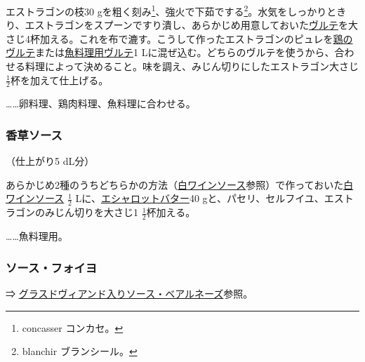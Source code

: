 \begin{recette}
エストラゴンの枝30 gを粗く刻み\footnote{concasser コンカセ。}、強火で下茹でする\footnote{blanchir
  ブランシール。}。水気をしっかりときり、エストラゴンをスプーンですり潰し、あらかじめ用意しておいた\protect\hyperlink{veloute}{ヴルテ}を大さじ4杯加える。これを布で漉す。こうして作ったエストラゴンのピュレを\protect\hyperlink{veloute-de-volaille}{鶏のヴルテ}または\protect\hyperlink{veloute-de-poisson}{魚料理用ヴルテ}1
Lに混ぜ込む。どちらのヴルテを使うから、合わせる料理によって決めること。味を調え、みじん切りにしたエストラゴン大さじ
\(\frac{1}{2}\)杯を加えて仕上げる。

\ldots{}\ldots{}卵料理、鶏肉料理、魚料理に合わせる。

\atoaki{}

\hypertarget{sauce-aux-fines-herbes-blanche}{%
\subsubsection{香草ソース}\label{sauce-aux-fines-herbes-blanche}}



（仕上がり5 dL分）

あらかじめ2種のうちどちらかの方法（\protect\hyperlink{sauce-vin-blanc}{白ワインソース}参照）で作っておいた\protect\hyperlink{sauce-vin-blanc}{白ワインソース}
\(\frac{1}{2}\)
Lに、\protect\hyperlink{beurre-d-echalote}{エシャロットバター}40
gと、パセリ、セルフイユ、エストラゴンのみじん切りを大さじ1
\(\frac{1}{2}\)杯加える。

\ldots{}\ldots{}魚料理用。

\atoaki{}

\hypertarget{sauce-foyot}{%
\subsubsection{ソース・フォイヨ}\label{sauce-foyot}}


⇒
\protect\hyperlink{sauce-bearnaise-a-la-glace-de-viande}{グラスドヴィアンド入りソース・ベアルネーズ}参照。


\end{recette}
